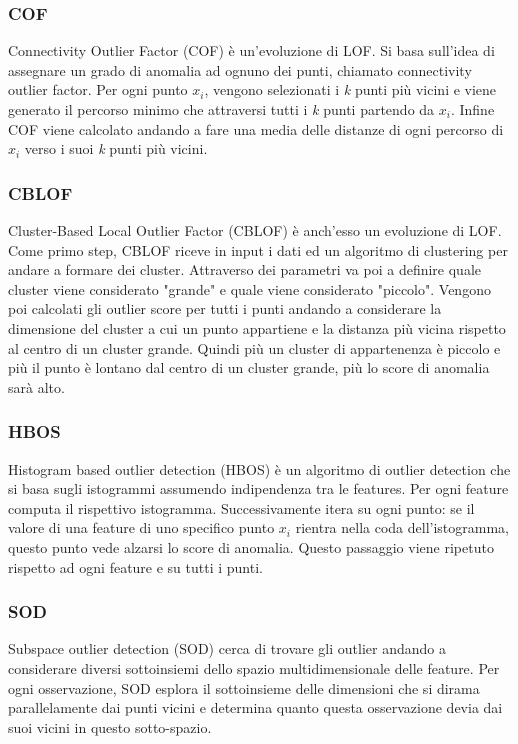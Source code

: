 \subsubsection{COF}
Connectivity Outlier Factor (COF) \cite{tang2002enhancing} è un'evoluzione di LOF. Si basa sull'idea di assegnare un grado di anomalia ad ognuno dei punti, chiamato connectivity outlier factor.
Per ogni punto $x_i$, vengono selezionati i \textit{k} punti più vicini e viene generato il percorso minimo che attraversi tutti i \textit{k} punti partendo da $x_i$. Infine COF viene calcolato andando a fare una media delle distanze di ogni percorso di $x_i$ verso i suoi \textit{k} punti più vicini.

\subsubsection{CBLOF}
Cluster-Based Local Outlier Factor (CBLOF) \cite{he2003discovering} è anch'esso un evoluzione di LOF.
Come primo step, CBLOF riceve in input i dati ed un algoritmo di clustering per andare a formare dei cluster. Attraverso dei parametri va poi a definire quale cluster viene considerato "grande" e quale viene considerato "piccolo". Vengono poi calcolati gli outlier score per tutti i punti andando a considerare la dimensione del cluster a cui un punto appartiene e la distanza più vicina rispetto al centro di un cluster grande. Quindi più un cluster di appartenenza è piccolo e più il punto è lontano dal centro di un cluster grande, più lo score di anomalia sarà alto. 

\subsubsection{HBOS}
Histogram based outlier detection (HBOS) \cite{goldstein2012histogram} è un algoritmo di outlier detection che si basa sugli istogrammi assumendo indipendenza tra le features. Per ogni feature computa il rispettivo istogramma. Successivamente itera su ogni punto: se il valore di una feature di uno specifico punto $x_i$ rientra nella coda dell'istogramma, questo punto vede alzarsi lo score di anomalia. Questo passaggio viene ripetuto rispetto ad ogni feature e su tutti i punti.

\subsubsection{SOD}
Subspace outlier detection (SOD) \cite{kriegel2009outlier} cerca di trovare gli outlier andando a considerare diversi sottoinsiemi dello spazio multidimensionale delle feature. Per ogni osservazione, SOD esplora il sottoinsieme delle dimensioni che si dirama parallelamente dai punti vicini e determina quanto questa osservazione devia dai suoi vicini in questo sotto-spazio. 

